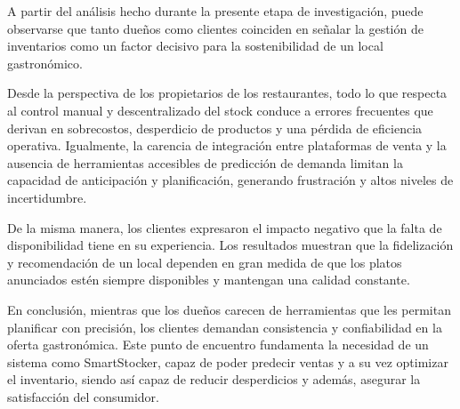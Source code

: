 A partir del análisis hecho durante la presente etapa de investigación, puede observarse que tanto dueños como clientes coinciden en señalar la gestión de inventarios como un factor decisivo para la sostenibilidad de un local gastronómico. 

Desde la perspectiva de los propietarios de los restaurantes, todo lo que respecta al control manual y descentralizado del stock conduce a errores frecuentes que derivan en sobrecostos, desperdicio de productos y una pérdida de eficiencia operativa. Igualmente, la carencia de integración entre plataformas de venta y la ausencia de herramientas accesibles de predicción de demanda limitan la capacidad de anticipación y planificación, generando frustración y altos niveles de incertidumbre.

De la misma manera, los clientes expresaron el impacto negativo que la falta de disponibilidad tiene en su experiencia. Los resultados muestran que la fidelización y recomendación de un local dependen en gran medida de que los platos anunciados estén siempre disponibles y mantengan una calidad constante.

En conclusión, mientras que los dueños carecen de herramientas que les permitan planificar con precisión, los clientes demandan consistencia y confiabilidad en la oferta gastronómica. Este punto de encuentro fundamenta la necesidad de un sistema como SmartStocker, capaz de poder predecir ventas y a su vez optimizar el inventario, siendo así capaz de reducir desperdicios y además, asegurar la satisfacción del consumidor.
